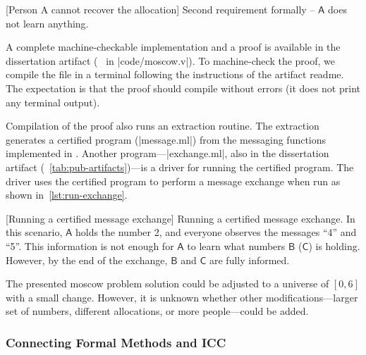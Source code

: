 \begin{center}
\begin{minipage}{\textwidth}
\captionsetup{type=lstlisting}
[Person A cannot recover the allocation]
{Second requirement formally -- \(\mathsf{A}\) does not learn anything.}
\label{lst:lemma-2}
\end{minipage}
\end{center}

A complete machine-checkable implementation and a proof is available in the dissertation artifact
(\cf~ in \pr|code/moscow.v|).
To machine-check the proof, we compile the file in a terminal following the instructions of the artifact readme.
The expectation is that the proof should compile without errors (it does not print any terminal output).

Compilation of the proof also runs an extraction routine.
The extraction generates a certified  program (\pr|message.ml|) from the messaging functions implemented in .
Another program---\pr|exchange.ml|, also in the dissertation artifact (\cf~\autoref{tab:pub-artifacts})---is a {driver} for running the certified program.
The driver uses the certified program to perform a message exchange when run as shown in~\autoref{lst:run-exchange}.

\begin{center}
\captionsetup{type=lstlisting}
\begin{minipage}{\textwidth}
\end{minipage}
[Running a certified message exchange]
{Running a certified message exchange. In this scenario, \(\mathsf{A}\) holds
the number 2, and everyone observes the messages \enquote{4} and \enquote{5}.
This information is not enough for \(\mathsf{A}\) to learn what numbers
\(\mathsf{B}\) (\resp \(\mathsf{C}\)) is holding. However, by the end of the
exchange, \(\mathsf{B}\) and \(\mathsf{C}\) are fully informed.}
\label{lst:run-exchange}
\end{center}

The presented moscow problem solution could be adjusted to a universe of \([0,
6]\) with a small change.
However, it is unknown whether other modifications---\eg larger set of numbers,
different allocations, or more people---could be added.

\subsubsection{Connecting Formal Methods and ICC}
\label{subsubsec:icc-formally}

